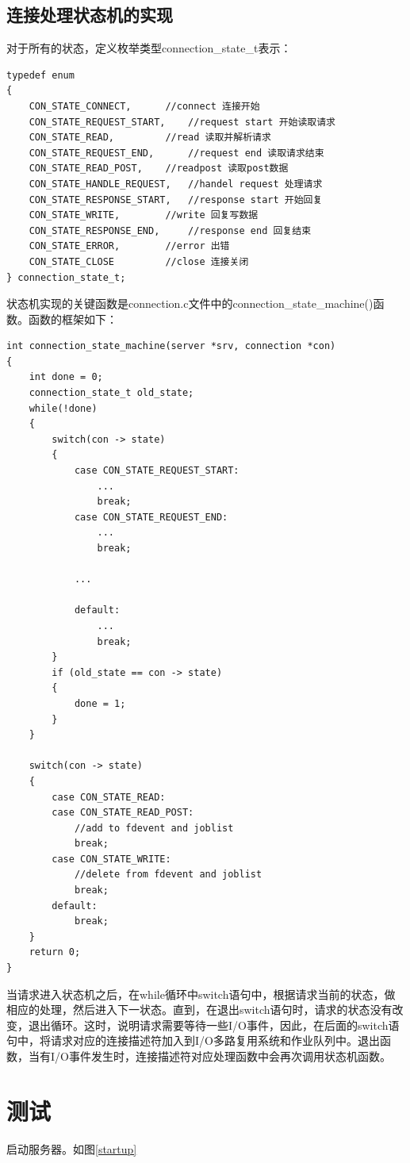 \documentclass[12pt, twoside, a4paper, xetex]{report}
\begin{document}
\subsection{连接处理状态机的实现}
	对于所有的状态，定义枚举类型connection\_state\_t表示：
\begin{verbatim}	
typedef enum 
{
	CON_STATE_CONNECT, 		//connect 连接开始 
	CON_STATE_REQUEST_START, 	//request start 开始读取请求
	CON_STATE_READ, 		//read 读取并解析请求
	CON_STATE_REQUEST_END, 		//request end 读取请求结束
	CON_STATE_READ_POST, 	//readpost 读取post数据
	CON_STATE_HANDLE_REQUEST, 	//handel request 处理请求
	CON_STATE_RESPONSE_START, 	//response start 开始回复
	CON_STATE_WRITE, 		//write 回复写数据
	CON_STATE_RESPONSE_END, 	//response end 回复结束
	CON_STATE_ERROR, 		//error 出错
	CON_STATE_CLOSE 		//close 连接关闭
} connection_state_t;
\end{verbatim}
	
	状态机实现的关键函数是connection.c文件中的connection\_state\_machine()函数。函数的框架如下：

\begin{verbatim}	
int connection_state_machine(server *srv, connection *con)
{
	int done = 0;
	connection_state_t old_state;
	while(!done)
	{	
		switch(con -> state)
		{
			case CON_STATE_REQUEST_START:
				...
				break;
			case CON_STATE_REQUEST_END:
				...
				break;
			
			...
			
			default:
				...
				break;
		}
		if (old_state == con -> state)
		{
			done = 1;
		}
	}
	
	switch(con -> state)
	{
		case CON_STATE_READ:
		case CON_STATE_READ_POST:
			//add to fdevent and joblist
			break;
		case CON_STATE_WRITE:
			//delete from fdevent and joblist
			break;
		default:
			break;
	}
	return 0;
}
\end{verbatim}

	当请求进入状态机之后，在while循环中switch语句中，根据请求当前的状态，做相应的处理，然后进入下一状态。直到，在退出switch语句时，请求的状态没有改变，退出循环。这时，说明请求需要等待一些I/O事件，因此，在后面的switch语句中，将请求对应的连接描述符加入到I/O多路复用系统和作业队列中。退出函数，当有I/O事件发生时，连接描述符对应处理函数中会再次调用状态机函数。
	
\section{测试}
	启动服务器。如图\ref{startup}
	
\end{document}
